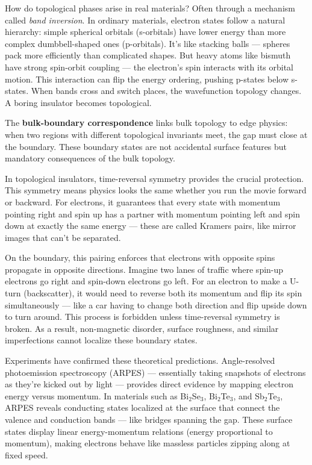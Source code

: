 How do topological phases arise in real materials? Often through a mechanism called \emph{band inversion}. In ordinary materials, electron states follow a natural hierarchy: simple spherical orbitals (s-orbitals) have lower energy than more complex dumbbell-shaped ones (p-orbitals). It's like stacking balls — spheres pack more efficiently than complicated shapes. But heavy atoms like bismuth have strong spin-orbit coupling — the electron's spin interacts with its orbital motion. This interaction can flip the energy ordering, pushing p-states below s-states. When bands cross and switch places, the wavefunction topology changes. A boring insulator becomes topological.

The \textbf{bulk-boundary correspondence} links bulk topology to edge physics: when two regions with different topological invariants meet, the gap must close at the boundary. These boundary states are not accidental surface features but mandatory consequences of the bulk topology.

In topological insulators, time-reversal symmetry provides the crucial protection. This symmetry means physics looks the same whether you run the movie forward or backward. For electrons, it guarantees that every state with momentum pointing right and spin up has a partner with momentum pointing left and spin down at exactly the same energy — these are called Kramers pairs, like mirror images that can't be separated.

On the boundary, this pairing enforces that electrons with opposite spins propagate in opposite directions. Imagine two lanes of traffic where spin-up electrons go right and spin-down electrons go left. For an electron to make a U-turn (backscatter), it would need to reverse both its momentum and flip its spin simultaneously — like a car having to change both direction and flip upside down to turn around. This process is forbidden unless time-reversal symmetry is broken. As a result, non-magnetic disorder, surface roughness, and similar imperfections cannot localize these boundary states. 

Experiments have confirmed these theoretical predictions. Angle-resolved photoemission spectroscopy (ARPES) — essentially taking snapshots of electrons as they're kicked out by light — provides direct evidence by mapping electron energy versus momentum. In materials such as Bi\(_2\)Se\(_3\), Bi\(_2\)Te\(_3\), and Sb\(_2\)Te\(_3\), ARPES reveals conducting states localized at the surface that connect the valence and conduction bands — like bridges spanning the gap. These surface states display linear energy-momentum relations (energy proportional to momentum), making electrons behave like massless particles zipping along at fixed speed.


